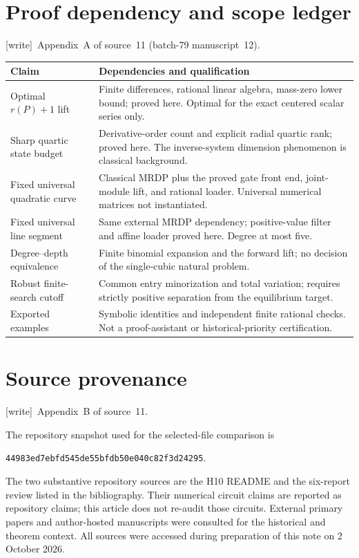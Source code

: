 \documentclass[11pt,letterpaper]{article}
\theoremstyle{definition}
\theoremstyle{remark}
\newcommand{\wtag}{\textup{[write]}}
\begin{document}
\section{Proof dependency and scope ledger}\label{ste:mx:app:ledger}

\noindent\wtag\ Appendix~A of source~11 (batch-79 manuscript~12).


\begin{center}
\small
\begin{tabular}{@{}p{}p{}@{}}
\toprule
Claim & Dependencies and qualification\\
\midrule
Optimal $r(P)+1$ lift & Finite differences, rational linear algebra,
mass-zero lower bound; proved here. Optimal for the exact centered scalar
series only.\\[4pt]
Sharp quartic state budget & Derivative-order count and explicit radial
quartic rank; proved here. The inverse-system dimension phenomenon is
classical background.\\[4pt]
Fixed universal quadratic curve & Classical MRDP plus the proved gate
front end, joint-module lift, and rational loader. Universal numerical
matrices not instantiated.\\[4pt]
Fixed universal line segment & Same external MRDP dependency; positive-value
filter and affine loader proved here. Degree at most five.\\[4pt]
Degree--depth equivalence & Finite binomial expansion and the forward lift;
no decision of the single-cubic natural problem.\\[4pt]
Robust finite-search cutoff & Common entry minorization and total variation;
requires strictly positive separation from the equilibrium target.\\[4pt]
Exported examples & Symbolic identities and independent finite rational
checks. Not a proof-assistant or historical-priority certification.\\
\bottomrule
\end{tabular}
\end{center}

\section{Source provenance}\label{ste:mx:app:provenance}

\noindent\wtag\ Appendix~B of source~11.


The repository snapshot used for the selected-file comparison is
\begin{center}
\small\texttt{44983ed7ebfd545de55bfdb50e040c82f3d24295}.
\end{center}
The two substantive repository sources are the H10 README and the six-report
review listed in the bibliography. Their numerical circuit claims are reported
as repository claims; this article does not re-audit those circuits. External
primary papers and author-hosted manuscripts were consulted for the historical
and theorem context. All sources were accessed during preparation of this
note on 2 October 2026.
\end{document}
